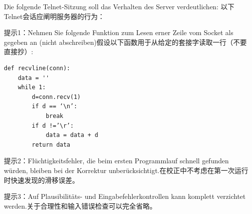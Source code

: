 \documentclass[fleqn]{article}
\begin{document}
Die folgende Telnet-Sitzung soll das Verhalten des Server verdeutlichen: 以下Telnet会话应阐明服务器的行为：


提示1：Nehmen Sie folgende Funktion zum Lesen erner Zeile vom Socket als gegeben an (nicht abschreiben)假设以下函数用于从给定的套接字读取一行（不要直接抄）:
\begin{lstlisting}
def recvline(conn):
    data = ''
    while 1:
        d=conn.recv(1)
        if d == ‘\n’:
            break
        if d !=’\r’:
            data = data + d
        return data
\end{lstlisting}

提示2：Flüchtigkeitsfehler, die beim ersten Programmlauf schnell gefunden würden, bleiben bei der Korrektur unberücksichtigt.在校正中不考虑在第一次运行时快速发现的滑移误差。

提示3：Auf Plausibilitäts- und Eingabefehlerkontrollen kann komplett verzichtet werden.关于合理性和输入错误检查可以完全省略。
\end{document}
